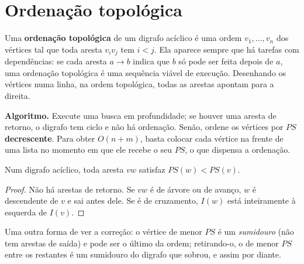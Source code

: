 \section{Ordenação topológica}\label{sec:topo}
Uma \textbf{ordenação topológica} de um digrafo acíclico é uma ordem $v_1,\dots,v_n$ dos vértices tal que toda aresta $v_iv_j$ tem $i<j$. Ela aparece sempre que há tarefas com dependências: se cada aresta $a\to b$ indica que $b$ só pode ser feita depois de $a$, uma ordenação topológica é uma sequência viável de execução. Desenhando os vértices numa linha, na ordem topológica, todas as arestas apontam para a direita.

\textbf{Algoritmo.} Execute uma busca em profundidade; se houver uma aresta de retorno, o digrafo tem ciclo e não há ordenação. Senão, ordene os vértices por \textbf{$PS$ decrescente}. Para obter $O(n+m)$, basta colocar cada vértice na frente de uma lista no momento em que ele recebe o seu $PS$, o que dispensa a ordenação.
\begin{teo}
Num digrafo acíclico, toda aresta $vw$ satisfaz $PS(w)<PS(v)$.
\end{teo}
\begin{proof}
Não há arestas de retorno. Se $vw$ é de árvore ou de avanço, $w$ é descendente de $v$ e sai antes dele. Se é de cruzamento, $I(w)$ está inteiramente à esquerda de $I(v)$.
\end{proof}
Uma outra forma de ver a correção: o vértice de menor $PS$ é um \emph{sumidouro} (não tem arestas de saída) e pode ser o último da ordem; retirando-o, o de menor $PS$ entre os restantes é um sumidouro do digrafo que sobrou, e assim por diante.


